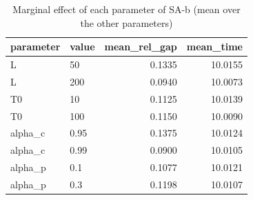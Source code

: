 \begin{table}[htbp]
\centering
\small
\caption{Marginal effect of each parameter of SA-b (mean over the other parameters)}
\label{tab:E8b_tuning_budget_SA-b_marginal}
\begin{tabular}{llrr}
\toprule
parameter & value & mean\_rel\_gap & mean\_time \\
\midrule
L & 50 & 0.1335 & 10.0155 \\
L & 200 & 0.0940 & 10.0073 \\
T0 & 10 & 0.1125 & 10.0139 \\
T0 & 100 & 0.1150 & 10.0090 \\
alpha\_c & 0.95 & 0.1375 & 10.0124 \\
alpha\_c & 0.99 & 0.0900 & 10.0105 \\
alpha\_p & 0.1 & 0.1077 & 10.0121 \\
alpha\_p & 0.3 & 0.1198 & 10.0107 \\
\bottomrule
\end{tabular}
\end{table}
